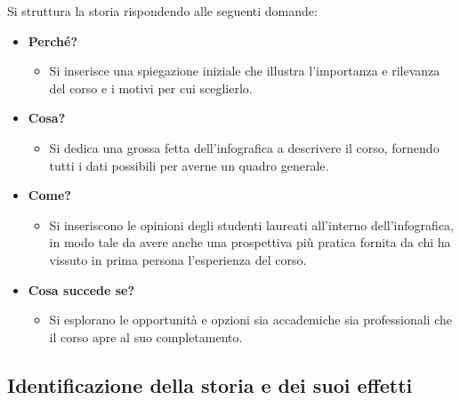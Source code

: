 \bigskip
\noindent Si struttura la storia rispondendo alle seguenti domande:
\begin{itemize}
    \item \textbf{Perché?}
    \begin{itemize}
        \item Si inserisce una spiegazione iniziale che illustra l'importanza e rilevanza del corso e i motivi per cui sceglierlo.
    \end{itemize}
    \item \textbf{Cosa?}
    \begin{itemize}
        \item Si dedica una grossa fetta dell'infografica a descrivere il corso, fornendo tutti i dati possibili per averne un quadro generale.
    \end{itemize}
    \item \textbf{Come?}
    \begin{itemize}
        \item Si inseriscono le opinioni degli studenti laureati all'interno dell'infografica, in modo tale da avere anche una prospettiva più pratica fornita
        da chi ha vissuto in prima persona l'esperienza del corso.
    \end{itemize}
    \item \textbf{Cosa succede se?}
    \begin{itemize}
        \item Si esplorano le opportunità e opzioni sia accademiche sia professionali che il corso apre al suo completamento.
    \end{itemize}
\end{itemize}


\subsection{Identificazione della storia e dei suoi effetti}
